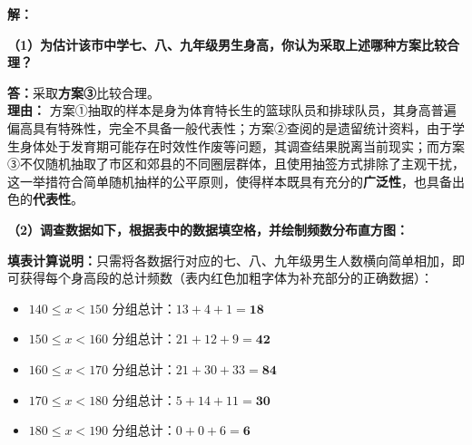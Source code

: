 \documentclass[12pt, a4paper]{ctexrep}
\begin{document}
\vspace{0.4cm}

\textbf{解：}

\textbf{（1）为估计该市中学七、八、九年级男生身高，你认为采取上述哪种方案比较合理？}

\vspace{0.2cm}
\textbf{答：}采取\textbf{方案③}比较合理。\\
\textbf{理由：} 方案①抽取的样本是身为体育特长生的篮球队员和排球队员，其身高普遍偏高具有特殊性，完全不具备一般代表性；方案②查阅的是遗留统计资料，由于学生身体处于发育期可能存在时效性作废等问题，其调查结果脱离当前现实；而方案③不仅随机抽取了市区和郊县的不同圈层群体，且使用抽签方式排除了主观干扰，这一举措符合简单随机抽样的公平原则，使得样本既具有充分的\textbf{广泛性}，也具备出色的\textbf{代表性}。

\vspace{0.6cm}

\textbf{（2）调查数据如下，根据表中的数据填空格，并绘制频数分布直方图：}

\vspace{0.2cm}
\textbf{填表计算说明：}只需将各数据行对应的七、八、九年级男生人数横向简单相加，即可获得每个身高段的总计频数（表内红色加粗字体为补充部分的正确数据）：
\begin{itemize}
  \item $140 \leqslant x < 150$ 分组总计：$13 + 4 + 1 = \boldsymbol{18}$
  \item $150 \leqslant x < 160$ 分组总计：$21 + 12 + 9 = \boldsymbol{42}$
  \item $160 \leqslant x < 170$ 分组总计：$21 + 30 + 33 = \boldsymbol{84}$
  \item $170 \leqslant x < 180$ 分组总计：$5 + 14 + 11 = \boldsymbol{30}$
  \item $180 \leqslant x < 190$ 分组总计：$0 + 0 + 6 = \boldsymbol{6}$
\end{itemize}
\end{document}
